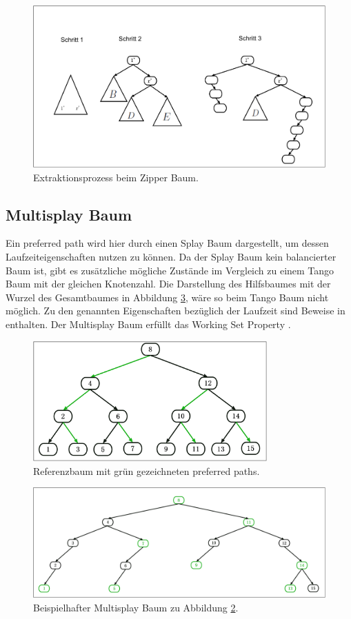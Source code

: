\documentclass[a4paper,12pt]{article}
\begin{document}
\begin{figure}[H]
	\centering
	\includegraphics[height= 0.5\textwidth]{Medien/Zipper/hybrid/extractHybrid}
	\caption{Extraktionsprozess beim Zipper Baum. }
	\label{fig:extractHybrid}
\end{figure}
\subsection{Multisplay Baum}
Ein preferred path wird hier durch einen Splay Baum dargestellt, um dessen Laufzeiteigenschaften nutzen zu können. Da der Splay Baum kein balancierter Baum ist, gibt es zusätzliche mögliche Zustände im Vergleich zu einem Tango Baum mit der gleichen Knotenzahl. Die Darstellung des Hilfsbaumes mit der Wurzel des Gesamtbaumes in Abbildung \ref{fig:pfadRepresentation}, wäre so beim Tango Baum nicht möglich. Zu den genannten Eigenschaften bezüglich der Laufzeit sind Beweise in \cite{multisplay} enthalten. Der Multisplay Baum erfüllt das Working Set Property \cite{porpMultiSplay}. 
\begin{figure}[H]
	\centering
	\includegraphics[width= 0.8\textwidth]{Medien/Multisplay/referenzTree}
	\caption {Referenzbaum mit grün gezeichneten preferred paths. }
	\label{fig:referenzTree}
\end{figure} 
\begin{figure}[H]
	\centering
	\includegraphics[width= 1\textwidth]{Medien/Multisplay/pfadRepresentation}
	\caption {Beispielhafter Multisplay Baum zu Abbildung \ref{fig:referenzTree}.}
	\label{fig:pfadRepresentation}
\end{figure} 
\end{document}
